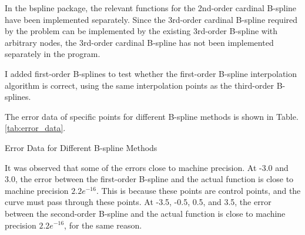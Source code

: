 \documentclass[a4paper]{article}
\begin{document}
\begin{sloppypar}
In the bspline package, the relevant functions for the 2nd-order cardinal
B-spline have been implemented separately. Since the 3rd-order cardinal
B-spline required by the problem can be implemented by the existing 3rd-order
B-spline with arbitrary nodes, the 3rd-order cardinal B-spline has not been
implemented separately in the program.

I added first-order B-splines to test whether the first-order B-spline
interpolation algorithm is correct, using the same interpolation points as the
third-order B-splines.

The error data of specific points for different B-spline methods is shown in
Table.\ref{tab:error_data}.

\begin{table}[H]
  \centering
  \renewcommand{\tablename}{Table.}
  \caption{Error Data for Different B-spline Methods}
  \label{tab:error_data}
\end{table}

It was observed that some of the errors close to machine precision. At -3.0 and
3.0, the error between the first-order B-spline and the actual function is
close to machine precision $2.2e^{-16}$. This is because these points are
control points, and the curve must pass through these points. At -3.5, -0.5,
0.5, and 3.5, the error between the second-order B-spline and the actual
function is close to machine precision $2.2e^{-16}$, for the same reason.


\end{sloppypar}
\end{document}
